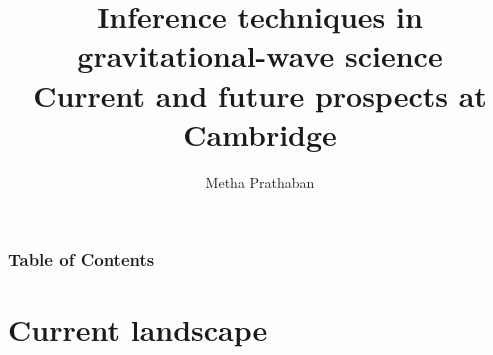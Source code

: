 \documentclass[aspectratio=169, 11pt]{beamer}
\title[Inference techniques in gravitational-wave science ] %
{Inference techniques in gravitational-wave science \\ \vspace{0.5em}
\large Current and future prospects at Cambridge}
\author[Metha Prathaban] %
{Metha Prathaban} %
\date{}
\def \bblock{\begin{beamerboxesrounded}[upper=uppercolor,lower=lowercolor,shadow=true]}
\def \eblock{\end{beamerboxesrounded}}
\begin{document}
\frame{\titlepage}
\begin{frame}
\frametitle{Table of Contents}
\tableofcontents
\end{frame}


\section{Current landscape}



    
    

    
\end{document}
